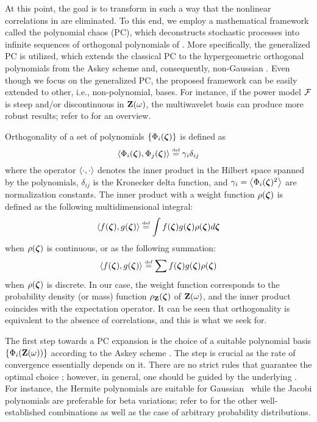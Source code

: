At this point, the goal is to transform  in such a way that the nonlinear correlations in  are eliminated. To this end, we employ a mathematical framework called the polynomial chaos (PC), which deconstructs stochastic processes into infinite sequences of orthogonal polynomials of \rvs. More specifically, the generalized PC \cite{xiu2002} is utilized, which extends the classical PC \cite{ghanem1991} to the hypergeometric orthogonal polynomials from the Askey scheme and, consequently, non-Gaussian \rvs. Even though we focus on the generalized PC, the proposed framework can be easily extended to other, i.e., non-polynomial, bases. For instance, if the power model $\mathcal{F}$ is steep and/or discontinuous in $\mathbf{Z}(\omega)$, the multiwavelet basis can produce more robust results; refer to \cite{maitre2010} for an overview.

Orthogonality of a set of polynomials $\{ \Phi_i(\boldsymbol{\zeta}) \}$ is defined as
\begin{equation} \elabel{orthogonality}
  \oInner{\pcb_i(\vz)}{\pcb_j(\vz)} \eqdef \pcn_i \delta_{ij}
\end{equation}
where the operator $\oInner{\idot}{\idot}$ denotes the inner product in the Hilbert space spanned by the polynomials, $\delta_{ij}$ is the Kronecker delta function, and $\pcn_i = \oInner{\pcb_i(\vz)^2}$ are normalization constants. The inner product with a weight function $\rho(\boldsymbol{\zeta})$ is defined as the following multidimensional integral:
\begin{equation} \elabel{inner-product-integral}
  \oInner{f(\vz)}{g(\vz)} \eqdef \int f(\vz) g(\vz) \PDF(\vz) d\vz
\end{equation}
when $\rho(\boldsymbol{\zeta})$ is continuous, or as the following summation:
\begin{equation} \elabel{inner-product-sum}
  \oInner{f(\vz)}{g(\vz)} \eqdef \sum f(\vz) g(\vz) \PDF(\vz)
\end{equation}
when $\rho(\boldsymbol{\zeta})$ is discrete. In our case, the weight function corresponds to the probability density (or mass) function $\rho_{\mathbf{Z}}(\boldsymbol{\zeta})$ of $\mathbf{Z}(\omega)$, and the inner product coincides with the expectation operator. It can be seen that orthogonality is equivalent to the absence of correlations, and this is what we seek for.

The first step towards a PC expansion is the choice of a suitable polynomial basis $\{ \Phi_i(\mathbf{Z}(\omega)) \}$ according to the Askey scheme \cite{xiu2002}. The step is crucial as the rate of convergence essentially depends on it. There are no strict rules that guarantee the optimal choice \cite{maitre2010, knio2006}; however, in general, one should be guided by the underlying \rvs. For instance, the Hermite polynomials are suitable for Gaussian \rvs\ while the Jacobi polynomials are preferable for beta variations; refer to \cite{xiu2010, xiu2002} for the other well-established combinations as well as the case of arbitrary probability distributions.

